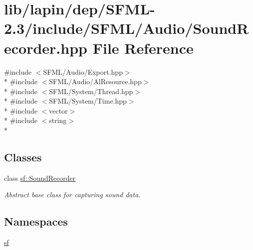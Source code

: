 \hypertarget{lapin_2dep_2_s_f_m_l-2_83_2include_2_s_f_m_l_2_audio_2_sound_recorder_8hpp}{\section{lib/lapin/dep/\-S\-F\-M\-L-\/2.3/include/\-S\-F\-M\-L/\-Audio/\-Sound\-Recorder.hpp File Reference}
\label{lapin_2dep_2_s_f_m_l-2_83_2include_2_s_f_m_l_2_audio_2_sound_recorder_8hpp}
}
{\ttfamily \#include $<$S\-F\-M\-L/\-Audio/\-Export.\-hpp$>$}\\*
{\ttfamily \#include $<$S\-F\-M\-L/\-Audio/\-Al\-Resource.\-hpp$>$}\\*
{\ttfamily \#include $<$S\-F\-M\-L/\-System/\-Thread.\-hpp$>$}\\*
{\ttfamily \#include $<$S\-F\-M\-L/\-System/\-Time.\-hpp$>$}\\*
{\ttfamily \#include $<$vector$>$}\\*
{\ttfamily \#include $<$string$>$}\\*
\subsection*{Classes}
\begin{DoxyCompactItemize}
\item 
class \hyperlink{classsf_1_1_sound_recorder}{sf\-::\-Sound\-Recorder}
\begin{DoxyCompactList}\small\item\em Abstract base class for capturing sound data. \end{DoxyCompactList}\end{DoxyCompactItemize}
\subsection*{Namespaces}
\begin{DoxyCompactItemize}
\item 
\hyperlink{namespacesf}{sf}
\end{DoxyCompactItemize}
